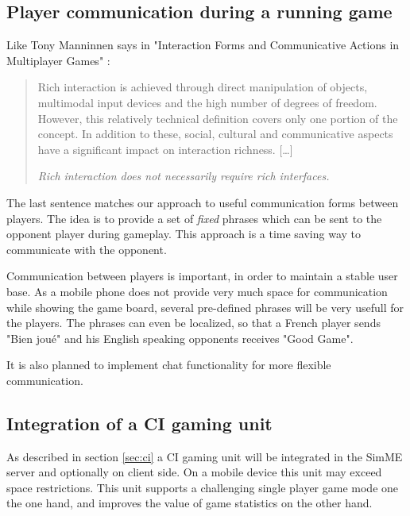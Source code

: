 	\subsection{Player communication during a running game}

		Like Tony Manninnen says in "Interaction Forms and Communicative Actions
		in Multiplayer Games" \cite{mann03}:

		\begin{quotation}

			Rich interaction is achieved through direct manipulation of objects,
			multimodal input devices and the high number of degrees of freedom.
			However, this relatively technical definition covers only one
			portion of the concept. In addition to these, social, cultural and
			communicative aspects have a significant impact on interaction
			richness. [\ldots]

			\textit{Rich interaction does not necessarily require rich
			interfaces.}

		\end{quotation}

		The last sentence matches our approach to useful communication forms
		between players. The idea is to provide a set of \emph{fixed} phrases
		which can be sent to the opponent player during gameplay. This approach
		is a time saving way to communicate with the opponent.

		Communication between players is important, in order to maintain a
		stable user base. As a mobile phone does not provide very much space for
		communication while showing the game board, several pre-defined phrases
		will be very usefull for the players. The phrases can even be localized,
		so that a French player sends "Bien jou\'e" and his English speaking
		opponents receives "Good Game".

		It is also planned to implement chat functionality for more flexible
		communication.

	\subsection{Integration of a CI gaming unit}

		As described in section \ref{sec:ci} a CI gaming unit will be integrated
		in the SimME server and optionally on client side. On a mobile device
		this unit may exceed space restrictions. This unit supports a
		challenging single player game mode one the one hand, and improves the
		value of game statistics on the other hand.

